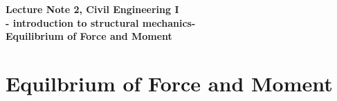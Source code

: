 \documentclass[10pt,a4j]{article}
\newlength{\minitwocolumn}
\begin{document}
\newcommand{\fat}[1]{\mbox{\boldmath $#1$}}
\newcommand{\D}{\partial}
\newcommand{\w}{\omega}
\newcommand{\ga}{\alpha}
\newcommand{\gb}{\beta}
\newcommand{\gx}{\xi}
\newcommand{\gz}{\zeta}
\newcommand{\vhat}[1]{\hat{\fat{#1}}}
\newcommand{\spc}{\vspace{0.7\baselineskip}}
\newcommand{\halfspc}{\vspace{0.3\baselineskip}}

\newcommand{\twofig}[2]
 {
   \begin{figure}
     \begin{minipage}[t]{\minitwocolumn}
         \begin{center}   #1
         \end{center}
     \end{minipage}
         \hspace{\columnsep}
     \begin{minipage}[t]{\minitwocolumn}
         \begin{center} #2
         \end{center}
     \end{minipage}
   \end{figure}
 }
\begin{center}
	{\Large \bf Lecture Note 2, Civil Engineering I \\
	- introduction to structural mechanics-\\
	Equilibrium of Force and Moment
	}  \\
\end{center}
\vspace{1.5cm}
\setcounter{section}{1}
\section{Equilbrium of Force and Moment}
\end{document}
